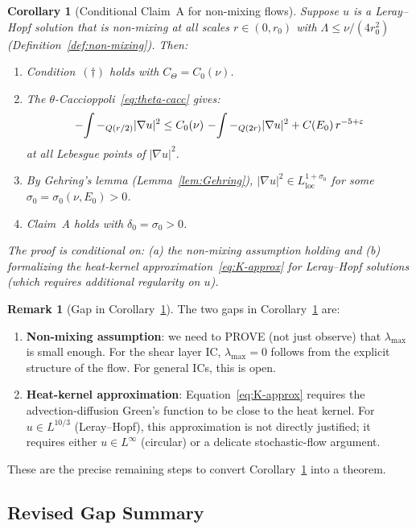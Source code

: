 \documentclass[11pt]{article}
\newtheorem{corollary}[theorem]{Corollary}
\theoremstyle{definition}
\newtheorem{remark}[theorem]{Remark}
\theoremstyle{remark}
\newcommand{\grad}{\nabla}
\newcommand{\Xint}{\mathop{\mathchoice{\vcenter{\hbox{$\displaystyle-$}}}%
  {\vcenter{\hbox{$\textstyle-$}}}%
  {\vcenter{\hbox{$\scriptstyle-$}}}%
  {\vcenter{\hbox{$\scriptscriptstyle-$}}}}\!\int}
\begin{document}
\begin{corollary}[Conditional Claim~A for non-mixing flows]\label{cor:Route-A}
  Suppose $u$ is a Leray--Hopf solution that is non-mixing at all scales
  $r\in(0,r_0)$ with $\Lambda\leq\nu/(4r_0^2)$ (Definition~\ref{def:non-mixing}).
  Then:
  \begin{enumerate}[label=(\roman*)]
  \item Condition~$(\dagger)$ holds with $C_\Theta=C_0(\nu)$.
  \item The $\theta$-Caccioppoli~\eqref{eq:theta-cacc} gives:
    \[
      \Xint-_{Q(r/2)}|\grad u|^2
      \leq C_0(\nu)\,\Xint-_{Q(2r)}|\grad u|^2 + C(E_0)\,r^{-5+\varepsilon}
    \]
    at all Lebesgue points of $|\grad u|^2$.
  \item By Gehring's lemma (Lemma~\ref{lem:Gehring}), $|\grad u|^2\in L^{1+\sigma_0}_{\mathrm{loc}}$
    for some $\sigma_0=\sigma_0(\nu,E_0)>0$.
  \item Claim~A holds with $\delta_0=\sigma_0>0$.
  \end{enumerate}
  The proof is conditional on: (a) the non-mixing assumption holding and
  (b) formalizing the heat-kernel approximation~\eqref{eq:K-approx} for
  Leray--Hopf solutions (which requires additional regularity on $u$).
\end{corollary}

\begin{remark}[Gap in Corollary~\ref{cor:Route-A}]
  The two gaps in Corollary~\ref{cor:Route-A} are:
  \begin{enumerate}[label=(\alph*)]
  \item \textbf{Non-mixing assumption}: we need to PROVE (not just observe)
    that $\lambda_{\max}$ is small enough.  For the shear layer IC,
    $\lambda_{\max}=0$ follows from the explicit structure of the flow.
    For general ICs, this is open.

  \item \textbf{Heat-kernel approximation}: Equation~\eqref{eq:K-approx}
    requires the advection-diffusion Green's function to be close to the
    heat kernel.  For $u\in L^{10/3}$ (Leray--Hopf), this approximation
    is not directly justified; it requires either $u\in L^\infty$ (circular)
    or a delicate stochastic-flow argument.
  \end{enumerate}
  These are the precise remaining steps to convert
  Corollary~\ref{cor:Route-A} into a theorem.
\end{remark}

\subsection{Revised Gap Summary}
\end{document}
